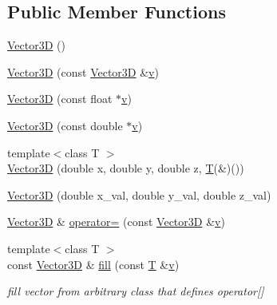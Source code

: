 \subsection*{Public Member Functions}
\begin{DoxyCompactItemize}
\item 
\hyperlink{class_d_d_surfaces_1_1_vector3_d_a73ba737984a707d10941c463359449f5}{Vector3D} ()
\item 
\hyperlink{class_d_d_surfaces_1_1_vector3_d_aca002b4e7f684e42be118701f5f36a24}{Vector3D} (const \hyperlink{class_d_d_surfaces_1_1_vector3_d}{Vector3D} \&\hyperlink{_multi_view_8cpp_a8320ee13ac034dbf6d624fe8953dd337}{v})
\item 
\hyperlink{class_d_d_surfaces_1_1_vector3_d_a66b1e2e00762d97d32977463936965aa}{Vector3D} (const float $\ast$\hyperlink{_multi_view_8cpp_a8320ee13ac034dbf6d624fe8953dd337}{v})
\item 
\hyperlink{class_d_d_surfaces_1_1_vector3_d_a2f148efd6032e40a105962cd7c4aed78}{Vector3D} (const double $\ast$\hyperlink{_multi_view_8cpp_a8320ee13ac034dbf6d624fe8953dd337}{v})
\item 
{\footnotesize template$<$class T $>$ }\\\hyperlink{class_d_d_surfaces_1_1_vector3_d_a84e13e88dbf750cf3b12117746226a9a}{Vector3D} (double x, double y, double z, \hyperlink{class_t}{T}(\&)())
\item 
\hyperlink{class_d_d_surfaces_1_1_vector3_d_a145fc8c25d65f9f53ee0bc782b0a2e62}{Vector3D} (double x\_\-val, double y\_\-val, double z\_\-val)
\item 
\hyperlink{class_d_d_surfaces_1_1_vector3_d}{Vector3D} \& \hyperlink{class_d_d_surfaces_1_1_vector3_d_a5eeba7fd085f99ab01063a6abbb95db7}{operator=} (const \hyperlink{class_d_d_surfaces_1_1_vector3_d}{Vector3D} \&\hyperlink{_multi_view_8cpp_a8320ee13ac034dbf6d624fe8953dd337}{v})
\item 
{\footnotesize template$<$class T $>$ }\\const \hyperlink{class_d_d_surfaces_1_1_vector3_d}{Vector3D} \& \hyperlink{class_d_d_surfaces_1_1_vector3_d_aca1a3d8cf1991c79d55c1c8b0c4cb436}{fill} (const \hyperlink{class_t}{T} \&\hyperlink{_multi_view_8cpp_a8320ee13ac034dbf6d624fe8953dd337}{v})
\begin{DoxyCompactList}\small\item\em fill vector from arbitrary class that defines operator\mbox{[}\mbox{]} \item\end{DoxyCompactList}\item 

\end{DoxyCompactItemize}
